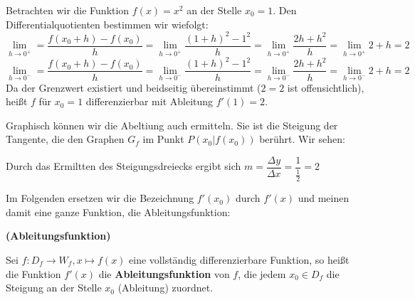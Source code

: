 \documentclass[ngerman, 12pt]{nssheetxea}
\begin{document}
\begin{example}
Betrachten wir die Funktion $f(x)=x^2$ an der Stelle $x_0=1$. Den Differentialquotienten bestimmen wir wiefolgt:
\[ \lim_{h\to 0^+} =  \dfrac{f(x_0+h)-f(x_0)}{h} = \lim_{h\to 0^+} \dfrac{(1+h)^2-1^2}{h} = \lim_{h\to 0^+} \dfrac{2h+h^2}{h} =  \lim_{h\to 0^+} 2+h = 2\]
\[ \lim_{h\to 0^-} =  \dfrac{f(x_0+h)-f(x_0)}{h} = \lim_{h\to 0^-} \dfrac{(1+h)^2-1^2}{h} = \lim_{h\to 0^-} \dfrac{2h+h^2}{h} =  \lim_{h\to 0^-} 2+h =2\]
Da der Grenzwert existiert und beidseitig übereinstimmt ($2=2$ ist offensichtlich), heißt $f$ für $x_0 = 1$ differenzierbar mit Ableitung $f'(1)=2$. \par
Graphisch können wir die Abeltiung auch ermitteln. Sie ist die Steigung der Tangente, die den Graphen $G_f$ im Punkt $P(x_0|f(x_0))$ berührt. Wir sehen:
\begin{center}
\end{center}
Durch das Ermiltten des Steigungsdreiecks ergibt sich $m=\dfrac{\Delta y}{\Delta x} = \dfrac{1}{\frac{1}{2}} = 2$
\end{example}

Im Folgenden ersetzen wir die Bezeichnung $f'(x_0)$ durch $f'(x)$ und meinen damit eine ganze Funktion, die Ableitungsfunktion:

\begin{definition} \textbf{(Ableitungsfunktion)} \par
Sei $f:D_f \rightarrow W_f, x \mapsto f(x)$ eine vollständig differenzierbare Funktion, so heißt die Funktion $f'(x)$ die \textbf{Ableitungsfunktion} von $f$, die jedem $x_0\in D_f$ die Steigung an der Stelle $x_0$ (Ableitung) zuordnet.
\end{definition}
\end{document}
